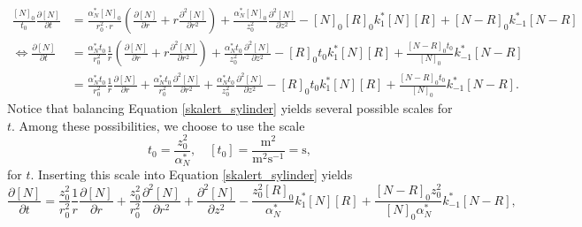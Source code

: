 \documentclass{article}
\begin{document}
\begin{align}
    \frac{[N]_0}{ t_0} \frac{\partial [N]}{\partial t} &= 
    \frac{\alpha_N^* [N]_0}{r_0^2 \cdot r} \left(\frac{\partial [N]}{\partial r} + r  \frac{\partial^2 [N]}{\partial r^2} \right) +  \frac{\alpha_N^* [N]_0}{z_0^2}  \frac{\partial^2 [N]}{\partial z^2} - [N]_0 [R]_0 k_1^* [N] [R] + [N-R]_0 k_{-1}^* [N-R] \nonumber\\
    \Leftrightarrow  \frac{\partial [N]}{\partial t} &= 
    \frac{\alpha_N^* t_0}{r_0^2} \frac{1}{r} \left(\frac{\partial [N]}{\partial r} + r \frac{\partial^2 [N]}{\partial r^2} \right) + \frac{\alpha_N^* t_0}{z_0^2}  \frac{\partial^2 [N]}{\partial z^2} - [R]_0 t_0  k_1^* [N] [R] + \frac{ [N-R]_0 t_0}{[N]_0}  k_{-1}^* [N-R]\nonumber\\
    &= 
    \frac{\alpha_N^* t_0}{r_0^2} \frac{1}{r} \frac{\partial [N]}{\partial r} + \frac{\alpha_N^* t_0}{r_0^2}  \frac{\partial^2 [N]}{\partial r^2}  + \frac{\alpha_N^* t_0}{z_0^2}  \frac{\partial^2 [N]}{\partial z^2} - [R]_0 t_0  k_1^* [N] [R] + \frac{ [N-R]_0 t_0}{[N]_0}  k_{-1}^* [N-R].\label{skalert_sylinder}
\end{align}
Notice that balancing Equation \eqref{skalert_sylinder} yields several possible scales for $t$. Among these possibilities, we choose to use the scale 
\begin{equation}
    t_0 = \frac{z_0^2}{\alpha_N^*}, \quad  [t_0] = \frac{\text{m}^2}{\text{m}^2 \text{s}^{-1}} = \text{s},
\end{equation}
for $t$. Inserting this scale into Equation \eqref{skalert_sylinder} yields
\begin{equation}
    \frac{\partial [N]}{\partial t} = 
    \frac{z_0^2}{r_0^2} \frac{1}{r} \frac{\partial [N]}{\partial r} + \frac{z_0^2}{r_0^2}  \frac{\partial^2 [N]}{\partial r^2}  +  \frac{\partial^2 [N]}{\partial z^2} -  \frac{z_0^2 [R]_0}{\alpha_N^*}  k_1^* [N] [R] + \frac{ [N-R]_0 z_0^2}{[N]_0 \alpha_N^*}  k_{-1}^* [N-R],
\end{equation}
\end{document}
